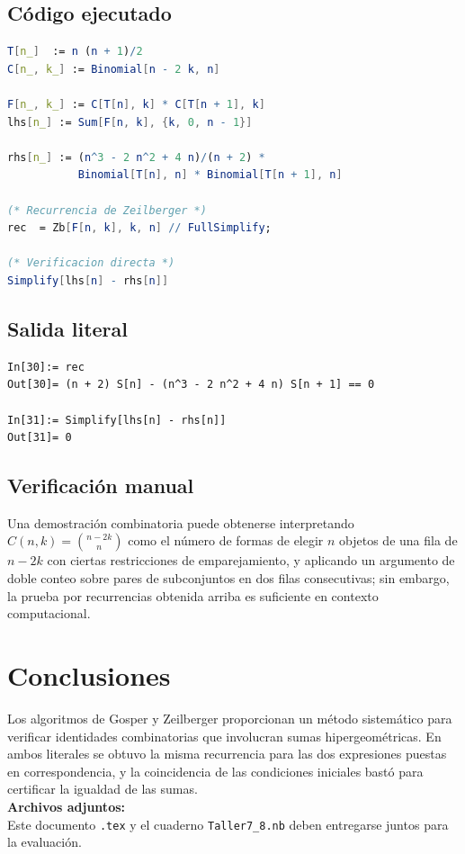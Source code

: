 \documentclass[12pt]{article}
\begin{document}
\subsection*{Código ejecutado}
\begin{lstlisting}[language=Mathematica]
T[n_]  := n (n + 1)/2
C[n_, k_] := Binomial[n - 2 k, n]

F[n_, k_] := C[T[n], k] * C[T[n + 1], k]
lhs[n_] := Sum[F[n, k], {k, 0, n - 1}]

rhs[n_] := (n^3 - 2 n^2 + 4 n)/(n + 2) *
           Binomial[T[n], n] * Binomial[T[n + 1], n]

(* Recurrencia de Zeilberger *)
rec  = Zb[F[n, k], k, n] // FullSimplify;

(* Verificacion directa *)
Simplify[lhs[n] - rhs[n]]
\end{lstlisting}

\subsection*{Salida literal}
\begin{verbatim}
In[30]:= rec
Out[30]= (n + 2) S[n] - (n^3 - 2 n^2 + 4 n) S[n + 1] == 0

In[31]:= Simplify[lhs[n] - rhs[n]]
Out[31]= 0
\end{verbatim}

\subsection*{Verificación manual}
Una demostración combinatoria puede obtenerse interpretando
\(C(n,k)=\binom{n-2k}{n}\)
como el número de formas de elegir \(n\) objetos de una fila de \(n-2k\) con
ciertas restricciones de emparejamiento, y aplicando un argumento de doble
conteo sobre pares de subconjuntos en dos filas consecutivas;
sin embargo, la prueba por recurrencias obtenida arriba es suficiente en
contexto computacional.

\section*{Conclusiones}
Los algoritmos de Gosper y Zeilberger proporcionan un método sistemático para
verificar identidades combinatorias que involucran sumas hipergeométricas.
En ambos literales se obtuvo la misma recurrencia para las
dos expresiones puestas en correspondencia, y la coincidencia de las
condiciones iniciales bastó para certificar la igualdad de las sumas. \\
\bigskip
\noindent\textbf{Archivos adjuntos:}\\
Este documento \texttt{.tex} y el cuaderno \texttt{Taller7\_8.nb} deben
entregarse juntos para la evaluación.
\end{document}
